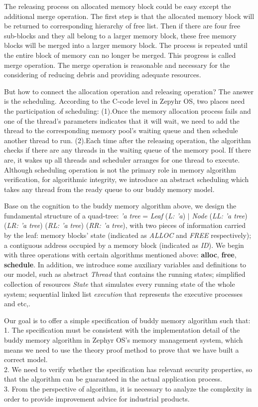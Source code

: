 \documentclass[runningheads]{llncs}
\begin{document}
The releasing process on allocated memory block could be easy except the additional merge operation. The first step is that the allocated memory block will be returned to corresponding hierarchy of free list. Then if there are four free sub-blocks and they all belong to a larger memory block, these free memory blocks will be merged into a larger memory block. The process is repeated until the entire block of memory can no longer be merged. This progress is called merge operation. The merge operation is reasonable and necessary for the considering of reducing debris and providing adequate resources.

But how to connect the allocation operation and releasing operation? The answer is the scheduling. According to the C-code level in Zepyhr OS, two places need the participation of scheduling: (1).Once the memory allocation process fails and one of the thread's parameters indicates that it will wait, we need to add the thread to the corresponding memory pool's waiting queue and then schedule another thread to run. (2).Each time after the releasing operation, the algorithm checks if there are any threads in the waiting queue of the memory pool. If there are, it wakes up all threads and scheduler arranges for one thread to execute. Although scheduling operation is not the primary role in memory algorithm verification, for algorithmic integrity, we introduce an abstract scheduling which takes any thread from the ready queue to our buddy memory model.

Base on the cognition to the buddy memory algorithm above, we design the fundamental structure of a quad-tree: \textsl{'a tree} = \textsl{Leaf} (\textsl{L: 'a}) $\mid$ \textsl{Node} (\textsl{LL: 'a tree}) (\textsl{LR: 'a tree}) (\textsl{RL: 'a tree}) (\textsl{RR: 'a tree}), with two pieces of information carried by the leaf: memory blocks' state (indicated as \textsl{ALLOC} and \textsl{FREE} respectively); a contiguous address occupied by a memory block (indicated as \textsl{ID}). We begin with three operations with certain algorithms mentioned above: \textbf{alloc}, \textbf{free}, \textbf{schedule}. In addition, we introduce some auxiliary variables and definitions to our model, such as abstract \textsl{Thread} that contains the running states; simplified collection of resources \textsl{State} that simulates every running state of the whole system; sequential linked list \textsl{execution} that represents the executive processes and etc,. 

Our goal is to offer a simple specification of buddy memory algorithm such that: \\
\phantom{x} 1. The specification must be consistent with the implementation detail of the buddy memory algorithm in Zephyr OS's memory management system, which means we need to use the theory proof method to prove that we have built a correct model. \\
\phantom{x} 2. We need to verify whether the specification has relevant security properties, so that the algorithm can be guaranteed in the actual application process. \\
\phantom{x} 3. From the perspective of algorithm, it is necessary to analyze the complexity in order to provide improvement advice for industrial products.
\end{document}
